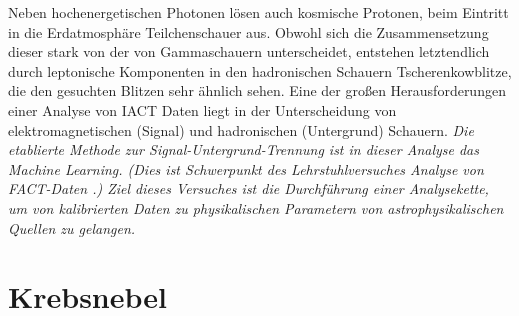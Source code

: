 Neben hochenergetischen Photonen lösen auch kosmische Protonen,
beim Eintritt in die Erdatmosphäre Teilchenschauer aus.
Obwohl sich die Zusammensetzung dieser stark von der von Gammaschauern unterscheidet,
entstehen letztendlich durch leptonische Komponenten in den hadronischen Schauern Tscherenkowblitze,
die den gesuchten Blitzen sehr ähnlich sehen.
Eine der großen Herausforderungen einer Analyse von IACT Daten liegt in der Unterscheidung von elektromagnetischen (Signal) und  hadronischen (Untergrund) Schauern.
\textit{Die etablierte Methode zur Signal-Untergrund-Trennung ist in dieser Analyse das
Machine Learning. (Dies ist Schwerpunkt des Lehrstuhlversuches Analyse von FACT-Daten \cite{fact}.)
Ziel dieses Versuches ist die Durchführung einer Analysekette, um von
kalibrierten Daten zu physikalischen Parametern von astrophysikalischen Quellen
zu gelangen.}

\section*{Krebsnebel}%
\label{sec:krebsnebel}

